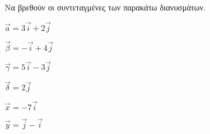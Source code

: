 Να βρεθούν οι συντεταγμένες των παρακάτω διανυσμάτων.
\begin{multicols}{3}
\begin{alist}
\item $ \vec{a}=3\vec{i}+2\vec{j} $
\item $ \vec{\beta}=-\vec{i}+4\vec{j} $
\item $ \vec{\gamma}=5\vec{i}-3\vec{j} $
\item $ \vec{\delta}=2\vec{j} $
\item $ \vec{x}=-7\vec{i} $
\item $ \vec{y}=\vec{j}-\vec{i} $
\end{alist}
\end{multicols}

